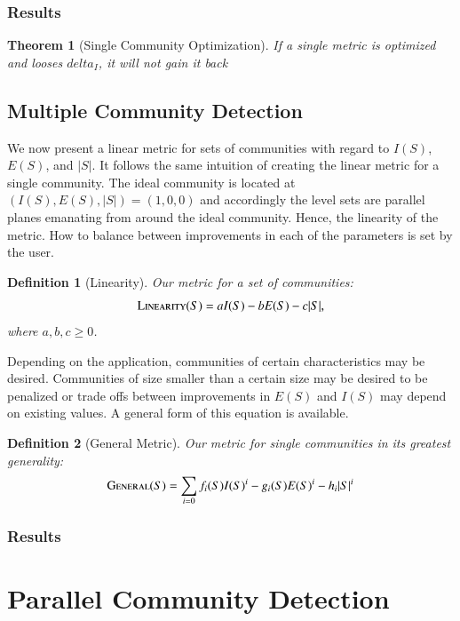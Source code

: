 \documentclass[phd,tocprelim]{cornell}
\newtheorem{theorem}{Theorem}[section]
\newtheorem{definition}{Definition}
\begin{document}
\subsection{Results}

\begin{theorem}[Single Community Optimization]
If a single metric is optimized and looses $delta_I$, it will not gain it back 
\end{theorem}

\section{Multiple Community Detection}


We now present a linear metric for sets of communities with regard to $I(S)$, $E(S)$, and $|S|$.  It follows the same intuition of creating the linear metric for a single community.  The ideal community is located at $(I(S), E(S), |S|) = (1, 0, 0)$ and accordingly the level sets are parallel planes emanating from around the ideal community.  Hence, the linearity of the metric.  How to balance between improvements in each of the parameters is set by the user.
\begin{definition}[Linearity]
 Our metric for a set of communities:
  \begin{equation}
   \mbox{\sc Linearity}(S) = a I(S) - b E(S) - c |S|,
  \end{equation}
where $a,b,c \geq 0$.
\end{definition}
Depending on the application, communities of certain characteristics may be desired.  Communities of size smaller than a certain size may be desired to be penalized or trade offs between improvements in $E(S)$ and $I(S)$ may depend on existing values.  A general form of this equation is available.
\begin{definition}[General Metric]
 Our metric for single communities in its greatest generality:
  \begin{equation}
   \mbox{\sc General} (S) = \sum\limits_{i = 0} f_i(S) I(S)^i - g_i(S) E(S)^i - h_i |S|^i
  \end{equation}
\end{definition}



\subsection{Results}

\chapter{Parallel Community Detection}
\end{document}
